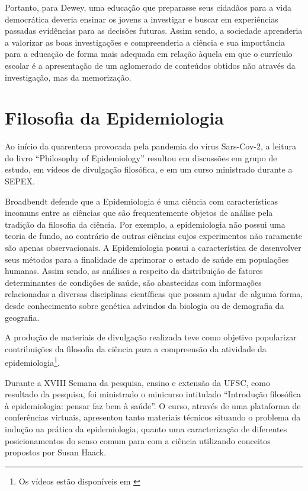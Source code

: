 \documentclass[12pt]{report}
\begin{document}
		Portanto, para Dewey, uma educação que preparasse seus cidadãos para a vida democrática deveria ensinar os jovens a investigar e buscar em experiências passadas evidências para as decisões futuras. Assim sendo, a sociedade aprenderia a valorizar as boas investigações e compreenderia a ciência e sua importância para a educação de forma mais adequada em relação àquela em que o currículo escolar é a apresentação de um aglomerado de conteúdos obtidos não através da investigação, mas da memorização.
	
	\section{Filosofia da Epidemiologia}
	
	 	Ao início da quarentena provocada pela pandemia do vírus Sars-Cov-2, a leitura do livro ``Philosophy of Epidemiology'' \cite{broadbent} resultou em discussões em grupo de estudo, em vídeos de divulgação filosófica, e em um curso ministrado durante a SEPEX.
	 	
	 	Broadbendt defende que a Epidemiologia é uma ciência com características incomuns entre as ciências que são frequentemente objetos de análise pela tradição da filosofia da ciência. Por exemplo, a epidemiologia não possui uma teoria de fundo, ao contrário de outras ciências cujos experimentos não raramente são apenas observacionais. A Epidemiologia possui a característica de desenvolver seus métodos para a finalidade de aprimorar o estado de saúde em populações humanas. Assim sendo, as análises a respeito da distribuição de fatores determinantes de condições de saúde, são abastecidas com informações relacionadas a diversas disciplinas científicas que possam ajudar de alguma forma, desde conhecimento sobre genética advindos da biologia ou de demografia da geografia.
	 	
	 	A produção de materiais de divulgação realizada teve como objetivo popularizar contribuições da filosofia da ciência para a compreensão da atividade da epidemiologia\footnote{Os vídeos estão disponíveis em \textcite{youtube}}.
	 	
	 	Durante a XVIII Semana da pesquisa, ensino e extensão da UFSC, como resultado da pesquisa, foi ministrado o minicurso intitulado ``Introdução filosófica à epidemiologia: pensar faz bem à saúde''.
	 	O curso, através de uma plataforma de conferências virtuais, apresentou tanto materiais técnicos situando o problema da indução na prática da epidemiologia, quanto uma caracterização de diferentes posicionamentos do senso comum para com a ciência utilizando conceitos propostos por Susan Haack.
		
\end{document}
